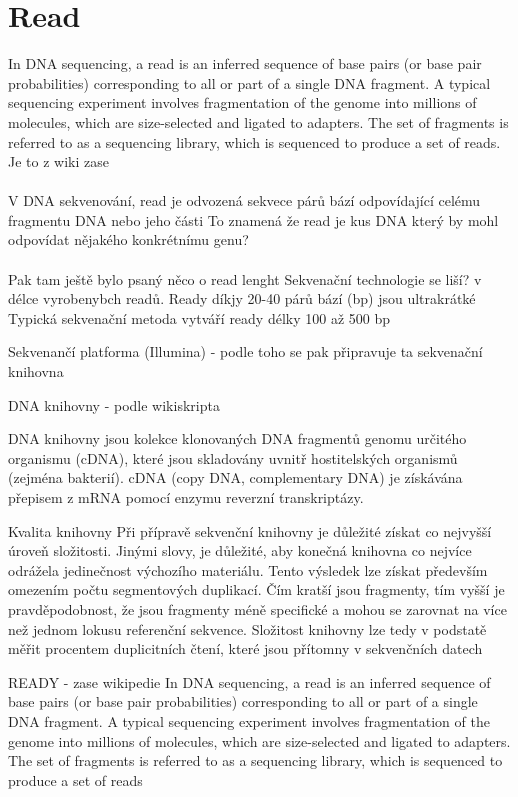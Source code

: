 \documentclass[czech,DP]{thesiskiv}
\begin{document}
\section{Read}
In DNA sequencing, a read is an inferred sequence of base pairs (or base pair probabilities) corresponding to all or part of a single DNA fragment. A typical sequencing experiment involves fragmentation of the genome into millions of molecules, which are size-selected and ligated to adapters. The set of fragments is referred to as a sequencing library, which is sequenced to produce a set of reads. Je to z wiki zase
\\
\\
V DNA sekvenování, read je odvozená sekvece párů bází odpovídající celému fragmentu DNA nebo jeho části
To znamená že read je kus DNA který by mohl odpovídat nějakého konkrétnímu genu? 
\\
\\
Pak tam ještě bylo psaný něco o read lenght
Sekvenační technologie se liší? v délce vyrobenybch readů. 
Ready díkjy 20-40 párů bází (bp) jsou ultrakrátké
Typická sekvenační metoda vytváří ready délky 100 až 500 bp

Sekvenančí platforma (Illumina) - podle toho se pak připravuje ta sekvenační knihovna


DNA knihovny - podle wikiskripta

DNA knihovny jsou kolekce klonovaných DNA fragmentů genomu určitého organismu (cDNA), které jsou skladovány uvnitř hostitelských organismů (zejména bakterií). cDNA (copy DNA, complementary DNA) je získávána přepisem z mRNA pomocí enzymu reverzní transkriptázy.

Kvalita knihovny
Při přípravě sekvenční knihovny je důležité získat co nejvyšší úroveň složitosti. Jinými slovy, je důležité, aby konečná knihovna co nejvíce odrážela jedinečnost výchozího materiálu. Tento výsledek lze získat především omezením počtu segmentových duplikací. Čím kratší jsou fragmenty, tím vyšší je pravděpodobnost, že jsou fragmenty méně specifické a mohou se zarovnat na více než jednom lokusu referenční sekvence. Složitost knihovny lze tedy v podstatě měřit procentem duplicitních čtení, které jsou přítomny v sekvenčních datech

READY - zase wikipedie
In DNA sequencing, a read is an inferred sequence of base pairs (or base pair probabilities) corresponding to all or part of a single DNA fragment. A typical sequencing experiment involves fragmentation of the genome into millions of molecules, which are size-selected and ligated to adapters. The set of fragments is referred to as a sequencing library, which is sequenced to produce a set of reads
\end{document}
